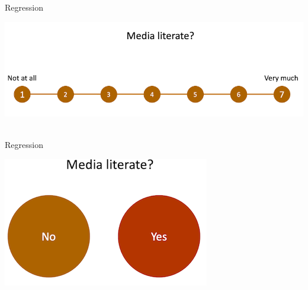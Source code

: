 \documentclass[handout]{beamer}
\begin{document}
\begin{frame}{Regression}
	
	\begin{center}
		\includegraphics[width=\linewidth,height=\textheight,keepaspectratio]{../pictures/medialiteracyscale.png} \\\
	\end{center}
	
	
	
	
	
	
\end{frame}



\begin{frame}{Regression}
	
	\begin{center}
		\includegraphics{../pictures/medialiteracydummy.png} \\\
	\end{center}
	
	
	
	
	
\end{frame}
\end{document}
